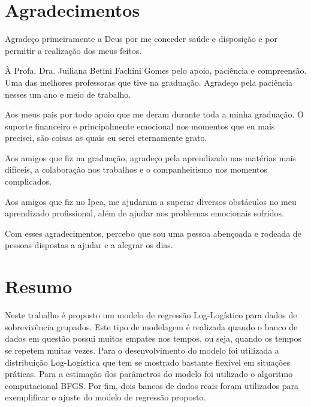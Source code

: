 \documentclass[a4paper,12pt]{article}
\newcommand*\NewPage{\newpage\null\newpage}
\begin{document}
 \NewPage
 

\section*{Agradecimentos}

Agradeço primeiramente a Deus por me conceder saúde e disposição e por permitir a realização dos meus feitos.

À Profa. Dra. Juiliana Betini Fachini Gomes pelo apoio, paciência e compreensão. Uma das melhores professoras que tive na graduação. Agradeço pela paciência nesses um ano e meio de trabalho.

Aos meus pais por todo apoio que me deram durante toda a minha graduação. O suporte financeiro e principalmente emocional nos momentos que eu mais precisei, são coisas as quais eu serei eternamente grato.

Aos amigos que fiz na graduação, agradeço pela aprendizado nas matérias mais difíceis, a colaboração nos trabalhos e o companheirismo nos momentos complicados.

Aos amigos que fiz no Ipea, me ajudaram a superar diversos obstáculos no meu aprendizado profissional, além de ajudar nos problemas emocionais sofridos.

Com esses agradecimentos, percebo que sou uma pessoa abençoada e rodeada de pessoas dispostas a ajudar e a alegrar os dias.


\tableofcontents

\NewPage

\section*{Resumo}

Neste trabalho é proposto um modelo de regressão Log-Logístico para dados de sobrevivência grupados. Este tipo de modelagem é realizada quando o banco de dados em questão possui muitos empates nos tempos, ou seja, quando os tempos se repetem muitas vezes. Para o desenvolvimento do modelo foi utilizada a distribuição Log-Logística que tem se mostrado bastante flexível em situações práticas. Para a estimação dos parâmetros do modelo foi utilizado o algoritmo computacional BFGS. Por fim, dois bancos de dados reais foram utilizados para exemplificar o ajuste do modelo de regressão proposto. \\ \\
\end{document}
